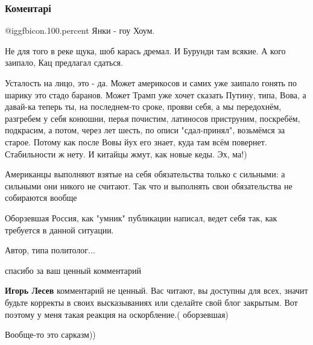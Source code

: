  
 
 
 
 
\subsubsection{Коментарі}

\begin{itemize} %
@igg{fbicon.100.percent} Янки - гоу Хоум.


Не для того в реке щука, шоб карась дремал. И Бурунди там всякие. А кого
заипало, Кац предлагал сдаться.

Усталость на лицо, это - да. Может америкосов и самих уже заипало гонять по
шарику это стадо баранов. Может Трамп уже хочет сказать Путину, типа, Вова, а
давай-ка теперь ты, на последнем-то сроке, прояви себя, а мы передохнём,
разгребем у себя конюшни, перья почистим, латиносов приструним, поскребём,
подкрасим, а потом, через лет шесть, по описи "сдал-принял", возьмёмся за
старое. Потому как после Вовы йух его знает, куда там всём повернет.
Стабильности ж нету. И китайцы жмут, как новые кеды. Эх, ма!)


Американцы выполняют взятые на себя обязательства только с сильными: а сильными
они никого не считают. Так что и выполнять свои обязательства не собираются
вообще


Оборзевшая Россия, как "умник" публикации написал, ведет себя так, как
требуется в данной ситуации.

Автор, типа политолог...

\begin{itemize} %
спасибо за ваш ценный комментарий

\textbf{Игорь Лесев} комментарий не ценный. Вас читают, вы доступны для всех, значит будьте корректы в своих высказываниях или сделайте свой блог закрытым. Вот поэтому у меня такая реакция на оскорбление.( оборзевшая)

Вообще-то это сарказм))
\end{itemize} %

\end{itemize} %
